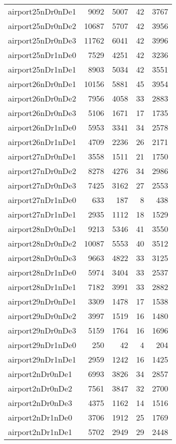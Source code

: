 \begin{longtable}{lrrrr}
airport25nDr0nDe1 & 9092 & 5007 & 42 & 3767 \\
airport25nDr0nDe2 & 10687 & 5707 & 42 & 3956 \\
airport25nDr0nDe3 & 11762 & 6041 & 42 & 3996 \\
airport25nDr1nDe0 & 7529 & 4251 & 42 & 3236 \\
airport25nDr1nDe1 & 8903 & 5034 & 42 & 3551 \\
airport26nDr0nDe1 & 10156 & 5881 & 45 & 3954 \\
airport26nDr0nDe2 & 7956 & 4058 & 33 & 2883 \\
airport26nDr0nDe3 & 5106 & 1671 & 17 & 1735 \\
airport26nDr1nDe0 & 5953 & 3341 & 34 & 2578 \\
airport26nDr1nDe1 & 4709 & 2236 & 26 & 2171 \\
airport27nDr0nDe1 & 3558 & 1511 & 21 & 1750 \\
airport27nDr0nDe2 & 8278 & 4276 & 34 & 2986 \\
airport27nDr0nDe3 & 7425 & 3162 & 27 & 2553 \\
airport27nDr1nDe0 & 633 & 187 & 8 & 438 \\
airport27nDr1nDe1 & 2935 & 1112 & 18 & 1529 \\
airport28nDr0nDe1 & 9213 & 5346 & 41 & 3550 \\
airport28nDr0nDe2 & 10087 & 5553 & 40 & 3512 \\
airport28nDr0nDe3 & 9663 & 4822 & 33 & 3125 \\
airport28nDr1nDe0 & 5974 & 3404 & 33 & 2537 \\
airport28nDr1nDe1 & 7182 & 3991 & 33 & 2882 \\
airport29nDr0nDe1 & 3309 & 1478 & 17 & 1538 \\
airport29nDr0nDe2 & 3997 & 1519 & 16 & 1480 \\
airport29nDr0nDe3 & 5159 & 1764 & 16 & 1696 \\
airport29nDr1nDe0 & 250 & 42 & 4 & 204 \\
airport29nDr1nDe1 & 2959 & 1242 & 16 & 1425 \\
airport2nDr0nDe1 & 6993 & 3826 & 34 & 2857 \\
airport2nDr0nDe2 & 7561 & 3847 & 32 & 2700 \\
airport2nDr0nDe3 & 4375 & 1162 & 14 & 1516 \\
airport2nDr1nDe0 & 3706 & 1912 & 25 & 1769 \\
airport2nDr1nDe1 & 5702 & 2949 & 29 & 2448 \\

\end{longtable}
